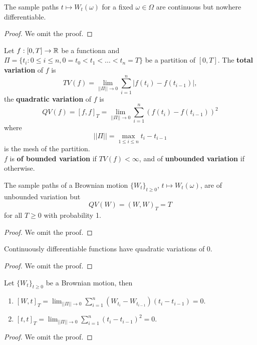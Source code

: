 \documentclass[11pt,fleqn]{book} %
\begin{document}
\begin{proposition} \label{prop:3213}
The sample paths \(t\mapsto W_t(\omega)\) for a fixed \(\omega \in \Omega\) are continuous but nowhere differentiable.
\end{proposition}
\begin{proof} We omit the proof.\end{proof}

\begin{definition} \label{def:3214}
Let \(f:[0, T]\rightarrow\mathbb{R}\) be a functionn and \(\Pi = \{t_i: 0 \leq i \leq n, 0 = t_0 < t_1 < \dots < t_n = T\}\) be a partition of \([0, T]\). The \textbf{total variation} of \(f\) is
\[
TV(f) = \lim_{||\Pi|| \rightarrow 0} \sum_{i=1}^n|f(t_i) - f(t_{i-1})|,
\]
the \textbf{quadratic variation} of \(f\) is
\[
QV(f) = [f, f]_T = \lim_{||\Pi||\rightarrow0}\sum_{i=1}^n(f(t_i) - f(t_{i-1}))^2
\]
where
\[
||\Pi|| = \max_{1 \leq i \leq n} t_i - t_{i-1}
\]
is the mesh of the partition. \\
\indent \(f\) is \textbf{of bounded variation} if \(TV(f) < \infty\), and of \textbf{unbounded variation} if otherwise.
\end{definition}

\begin{theorem} \label{thm:3215}
The sample paths of a Brownian motion \(\{W_t\}_{t\geq0}\), \(t \mapsto W_t(\omega)\), are of unbounded variation but
\[
QV(W) = (W, W)_T = T
\]
for all \(T\geq0\) with probability 1.
\end{theorem}
\begin{proof} We omit the proof.\end{proof}

\begin{theorem} \label{thm:3216}
Continuously differentiable functions have quadratic variations of 0.
\end{theorem}
\begin{proof} We omit the proof.\end{proof}

\begin{theorem} \label{thm:3217}
Let \(\{W_t\}_{t\geq0}\) be a Brownian motion, then
\begin{enumerate}
    \item \([W, t]_T = \lim_{||\Pi||\rightarrow0}\sum_{i=1}^n(W_{t_i} - W_{t_{i-1}})(t_i - t_{i-1}) = 0\).
    \item \([t, t]_T = \lim_{||\Pi||\rightarrow0}\sum_{i=1}^n(t_i - t_{i-1})^2 = 0\).    
\end{enumerate}
\end{theorem}
\begin{proof} We omit the proof.\end{proof}
\end{document}

